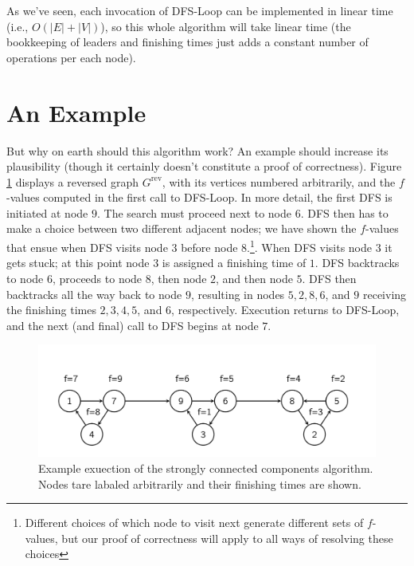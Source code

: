 \documentclass [12pt]{article}
\theoremstyle{definition}
\begin{document}
As we've seen, each invocation of DFS-Loop can be implemented in linear time (i.e., $O(|E|+ |V |)$), so this whole algorithm will take linear time (the bookkeeping of leaders and finishing times just adds a constant number of operations per each node).

\section{An Example}
 
But why on earth should this algorithm work? An example should increase its plausibility (though it certainly doesn't constitute a proof of correctness). Figure \ref{fig:g_rev_scc} displays a reversed graph $G^{\text{rev}}$, with its vertices numbered arbitrarily, and the $f$-values computed in the first call to DFS-Loop. In more detail, the first DFS is initiated at node $9$. The search must proceed next to node $6$. DFS then has to make a choice between two different adjacent nodes; we have shown the $f$-values that ensue when DFS visits node $3$ before node $8$.\footnote{Different choices of which node to visit next generate different sets of $f$-values, but our proof of correctness will apply to all ways of resolving these choices}. When DFS visits node $3$ it gets stuck; at this point node $3$ is assigned a finishing time of $1$. DFS backtracks to node $6$, proceeds to node $8$, then node $2$, and then node $5$. DFS then backtracks all the way back to node $9$, resulting in nodes $5, 2, 8, 6$, and $9$ receiving the finishing times $2, 3, 4, 5$, and $6$, respectively. Execution returns to DFS-Loop, and the next (and final) call to DFS begins at node $7$.

\begin{figure}[h!]
\includegraphics[scale=0.8]{g_rev_scc.png}
\caption{Example exuection of the strongly connected components algorithm. Nodes tare labaled arbitrarily and their finishing times are shown.}
\label{fig:g_rev_scc}
\end{figure}
\end{document}
